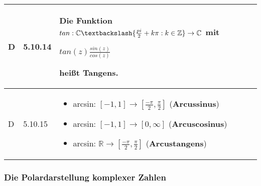 \begin{longtable}{p{0.75cm} p{1cm} p{16cm}}
        \midrule
        D   & 5.10.14&  Die Funktion $tan: \mathbb{C} \textbackslash \{\frac{pi}{2}+k\pi:k \in \mathbb{Z}\} \rightarrow \mathbb{C}$ mit \hfill \break
                        \centerline{$tan(z) \frac{sin(z)}{cos(z)}$}
                        heißt \textbf{Tangens}. \\
        \midrule
        D   & 5.10.15&  \begin{itemize}[topsep=-0.5cm]
                            \item[] arcsin: $[-1,1] \rightarrow [\frac{-\pi}{2},\frac{\pi}{2}]$ (\textbf{Arcussinus})
                            \item[] arcsin: $[-1,1] \rightarrow [0, \infty]$ (\textbf{Arcuscosinus})
                            \item[] arcsin: $\mathbb{R} \rightarrow [\frac{-\pi}{2},\frac{\pi}{2}]$ (\textbf{Arcustangens})
                        \end{itemize} \vspace{-0cm} \\

        \bottomrule

    \end{longtable}

\subsubsection{Die Polardarstellung komplexer Zahlen}


